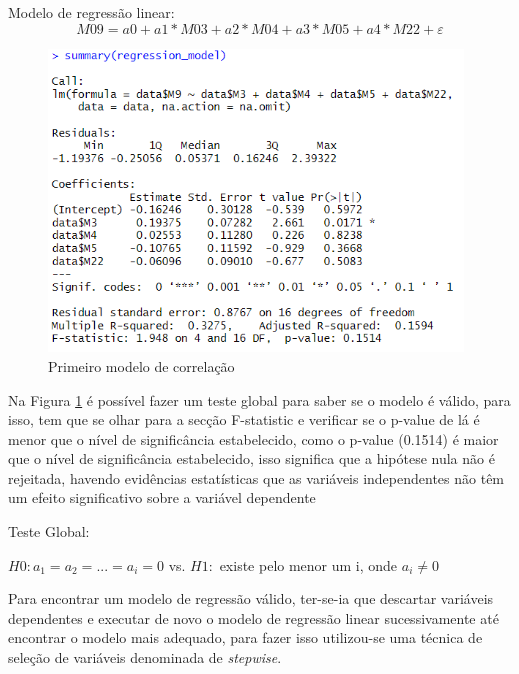 \documentclass[%
 aip,
cp,  %
 amsmath,amssymb,%
 reprint,%
]{revtex4-2}
\begin{document}
Modelo de regressão linear: \[ M09 = a0 + a1*M03 + a2*M04 + a3*M05 + a4*M22 + \varepsilon\]

\begin{figure}[!h]
    \centering
    \includegraphics[width=11cm]{imagens/questao3/questao3PrimeiraregressaoLinear.png}
    \caption{Primeiro modelo de correlação}
    \label{questao3OutputCorrelacao1}
\end{figure}

\vspace{0.2cm}

Na Figura \ref{questao3OutputCorrelacao1} é possível fazer um teste global para saber se o modelo é válido, para isso,  tem que se olhar para a secção F-statistic e verificar se o p-value de lá é menor que o nível de significância estabelecido, como o p-value (0.1514) é maior que o nível de significância estabelecido, isso significa que a hipótese nula não é rejeitada, havendo evidências estatísticas que as variáveis independentes não têm um efeito significativo sobre a variável dependente

Teste Global: 
\begin{center}
        $H0:  a_{1} = a_{2} = ... = a_{i} = 0 $\hspace{0.5cm}
    vs. \hspace{0.5cm}
   $ H1:$  existe pelo menor um i, onde $a_{i} \ne 0$
\end{center}



Para encontrar um modelo de regressão válido, ter-se-ia que descartar variáveis dependentes e executar de novo o modelo de regressão linear sucessivamente até encontrar o modelo mais adequado, para fazer isso utilizou-se uma técnica de seleção de variáveis denominada de \textit{stepwise}.
\end{document}
